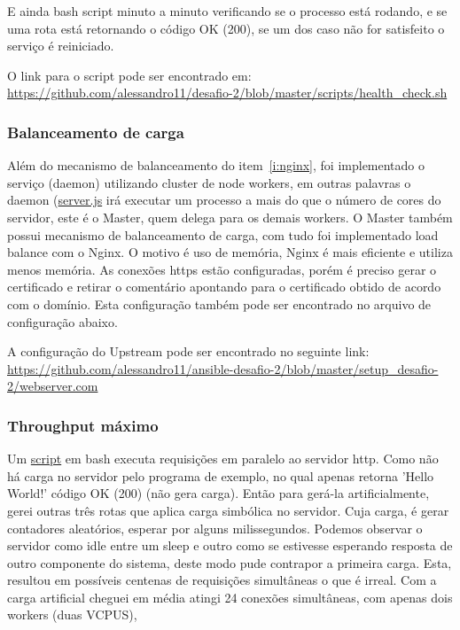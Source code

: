 E ainda bash script minuto a minuto verificando se o processo está rodando, e se
uma rota está retornando o código OK (200), se um dos caso não for
satisfeito o serviço é reiniciado.

O link para o script pode ser encontrado em:\\
\href{https://github.com/alessandro11/desafio-2/blob/master/scripts/health\_check.sh}{https://github.com/alessandro11/desafio-2/blob/master/scripts/health\_check.sh}


\subsubsection{Balanceamento de carga}
Além do mecanismo de balanceamento do item~\ref{i:nginx}, foi
implementado o serviço (daemon) utilizando cluster de node workers, em
outras palavras o daemon
(\href{https://github.com/alessandro11/desafio-2/blob/master/shipitfile.js}{server.js}
irá executar um processo a mais do que o número de cores do servidor,
este é o Master, quem delega para os demais workers. O Master também
possui mecanismo de balanceamento de carga, com tudo foi implementado
load balance com o Nginx. O motivo é uso de memória, Nginx é mais
eficiente e utiliza menos memória. As conexões https estão
configuradas, porém é preciso gerar o certificado e retirar o
comentário apontando para o certificado obtido de acordo com o
domínio. Esta configuração também pode ser encontrado no arquivo de
configuração abaixo.

A configuração do Upstream pode ser encontrado no seguinte link:\\
\href{https://github.com/alessandro11/ansible-desafio-2/blob/master/setup\_desafio-2/webserver.com}{https://github.com/alessandro11/ansible-desafio-2/blob/master/setup\_desafio-2/webserver.com}


\subsubsection{Throughput máximo}
Um
\href{https://github.com/alessandro11/desafio-2/blob/master/scripts/workload.sh}{script}
em bash executa requisições em paralelo ao servidor http. Como não há
carga no servidor pelo programa de exemplo, no qual apenas retorna
'Hello World!' código OK (200) (não gera carga). Então para gerá-la
artificialmente, gerei outras três rotas que aplica carga simbólica
no servidor. Cuja carga, é gerar contadores aleatórios, esperar por
alguns milissegundos. Podemos observar o servidor como idle entre um
sleep e outro como se estivesse esperando resposta de outro componente
do sistema, deste modo pude contrapor a primeira carga. Esta, resultou
em possíveis centenas de requisições simultâneas o que é irreal. Com a
carga artificial cheguei em média atingi 24 conexões simultâneas, com
apenas dois workers (duas VCPUS),

